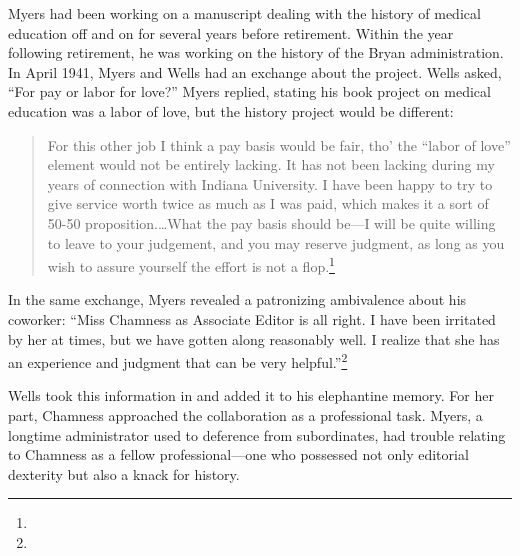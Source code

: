 \documentclass[
  american,
  letterpaper,
]{scrreprt}
\begin{document}
Myers had been working on a manuscript dealing with the history of
medical education off and on for several years before retirement. Within
the year following retirement, he was working on the history of the
Bryan administration. In April 1941, Myers and Wells had an exchange
about the project. Wells asked, ``For pay or labor for love?'' Myers
replied, stating his book project on medical education was a labor of
love, but the history project would be different:

\begin{quote}
For this other job I think a pay basis would be fair, tho' the ``labor
of love'' element would not be entirely lacking. It has not been lacking
during my years of connection with Indiana University. I have been happy
to try to give service worth twice as much as I was paid, which makes it
a sort of 50-50 proposition.\ldots What the pay basis should be---I will
be quite willing to leave to your judgement, and you may reserve
judgment, as long as you wish to assure yourself the effort is not a
flop.\footnote{}
\end{quote}

In the same exchange, Myers revealed a patronizing ambivalence about his
coworker: ``Miss Chamness as Associate Editor is all right. I have been
irritated by her at times, but we have gotten along reasonably well. I
realize that she has an experience and judgment that can be very
helpful.''\footnote{}

Wells took this information in and added it to his elephantine memory.
For her part, Chamness approached the collaboration as a professional
task. Myers, a longtime administrator used to deference from
subordinates, had trouble relating to Chamness as a fellow
professional---one who possessed not only editorial dexterity but also a
knack for history.
\end{document}
